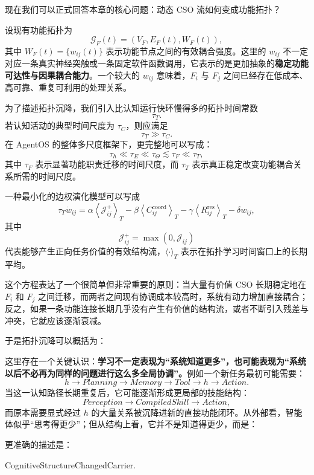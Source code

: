 现在我们可以正式回答本章的核心问题：动态 CSO 流如何变成功能拓扑？

设现有功能拓扑为
\[
\mathcal{G}_F(t)
=
\left(
V_F,
E_F(t),
W_F(t)
\right),
\]
其中 $W_F(t)=\{w_{ij}(t)\}$ 表示功能节点之间的有效耦合强度。这里的 $w_{ij}$ 不一定对应一条真实神经突触或一条固定软件函数调用，它表示的是更加抽象的\textbf{稳定功能可达性与因果耦合能力}。一个较大的 $w_{ij}$ 意味着，$F_i$ 与 $F_j$ 之间已经存在低成本、高可靠、重复可利用的处理关系。

为了描述拓扑沉降，我们引入比认知运行快环慢得多的拓扑时间常数
\[
\tau_T.
\]
若认知活动的典型时间尺度为 $\tau_C$，则应满足
\[
\boxed{
\tau_T
\gg
\tau_C.
}
\]
在 AgentOS 的整体多尺度框架下，更完整地可以写成：
\[
\tau_h
\ll
\tau_E
\ll
\tau_\Theta
\lesssim
\tau_F
\ll
\tau_T,
\]
其中 $\tau_F$ 表示显著功能职责迁移的时间尺度，而 $\tau_T$ 表示真正稳定改变功能耦合关系所需的时间尺度。

一种最小化的边权演化模型可以写成
\[
\tau_T
\dot w_{ij}
=
\alpha
\left\langle
\mathcal{J}_{ij}^{+}
\right\rangle_T
-
\beta
\left\langle
C_{ij}^{\mathrm{coord}}
\right\rangle_T
-
\gamma
\left\langle
R_{ij}^{\mathrm{res}}
\right\rangle_T
-
\delta
w_{ij},
\]
其中
\[
\mathcal{J}_{ij}^{+}
=
\max
\left(
0,
\mathcal{J}_{ij}
\right)
\]
代表能够产生正向任务价值的有效结构流，$\langle\cdot\rangle_T$ 表示在拓扑学习时间窗口上的长期平均。

这个方程表达了一个很简单但非常重要的原则：当大量有价值 CSO 长期稳定地在 $F_i$ 和 $F_j$ 之间迁移，而两者之间现有协调成本较高时，系统有动力增加直接耦合；反之，如果一条功能连接长期几乎没有产生有价值的结构流，或者不断引入残差与冲突，它就应该逐渐衰减。

于是拓扑沉降可以概括为：
\begin{statementbox}
\centering
{}
\end{statementbox}

这里存在一个关键认识：\textbf{学习不一定表现为``系统知道更多''，也可能表现为``系统以后不必再为同样的问题进行这么多全局协调''。}例如一个新任务最初可能需要：
\[
h
\rightarrow
Planning
\rightarrow
Memory
\rightarrow
Tool
\rightarrow
h
\rightarrow
Action.
\]
当这一认知路径长期重复后，它可能逐渐形成更局部的技能结构：
\[
Perception
\rightarrow
CompiledSkill
\rightarrow
Action,
\]
而原本需要显式经过 $h$ 的大量关系被沉降进新的直接功能闭环。从外部看，智能体似乎``思考得更少''；但从结构上看，它并不是知道得更少，而是：
\begin{statementbox}
\centering
{}
\end{statementbox}
更准确的描述是：
\begin{statementbox}
CognitiveStructureChangedCarrier.
\end{statementbox}

